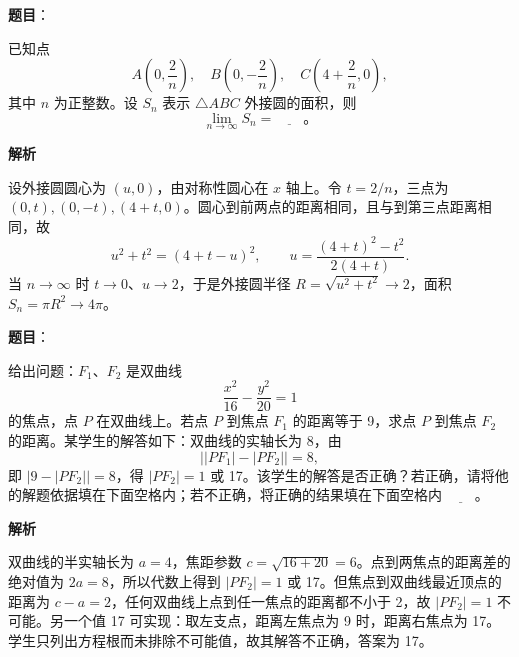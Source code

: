 \begin{answer}

\textbf{题目}：

已知点
\nopagebreak[4]
\[
    A\left(0,\frac{2}{n}\right),\quad B\left(0,-\frac{2}{n}\right),\quad C\left(4+\frac{2}{n},0\right),
\]
    其中 \(n\) 为正整数。设 \(S_n\) 表示 \(\triangle ABC\) 外接圆的面积，则
\nopagebreak[4]
\[
    \lim_{n\to\infty}S_n=\underline{\qquad}\mbox{。}
\]

\textbf{解析}

设外接圆圆心为 \((u,0)\)，由对称性圆心在 \(x\) 轴上。令 \(t=2/n\)，三点为 \((0,t),(0,-t),(4+t,0)\)。圆心到前两点的距离相同，且与到第三点距离相同，故
\nopagebreak[4]
\[
u^2+t^2=(4+t-u)^2,
\qquad u=\frac{(4+t)^2-t^2}{2(4+t)}.
\]
当 \(n\to\infty\) 时 \(t\to0\)、\(u\to2\)，于是外接圆半径 \(R=\sqrt{u^2+t^2}\to2\)，面积 \(S_n=\pi R^2\to4\pi\)。


\end{answer}
\begin{answer}

\textbf{题目}：

给出问题：\(F_1\text{、}F_2\) 是双曲线
\nopagebreak[4]
\[
    \frac{x^2}{16}-\frac{y^2}{20}=1
\]
    的焦点，点 \(P\) 在双曲线上。若点 \(P\) 到焦点 \(F_1\) 的距离等于 9，求点 \(P\) 到焦点 \(F_2\) 的距离。某学生的解答如下：双曲线的实轴长为 8，由
\nopagebreak[4]
\[
    \bigl||PF_1|-|PF_2|\bigr|=8,
\]
    即 \(|9-|PF_2||=8\)，得 \(|PF_2|=1\) 或 17。该学生的解答是否正确？若正确，请将他的解题依据填在下面空格内；若不正确，将正确的结果填在下面空格内 \(\underline{\qquad}\)。

\textbf{解析}

双曲线的半实轴长为 \(a=4\)，焦距参数 \(c=\sqrt{16+20}=6\)。点到两焦点的距离差的绝对值为 \(2a=8\)，所以代数上得到 \(|PF_2|=1\) 或 17。但焦点到双曲线最近顶点的距离为 \(c-a=2\)，任何双曲线上点到任一焦点的距离都不小于 2，故 \(|PF_2|=1\) 不可能。另一个值 17 可实现：取左支点，距离左焦点为 9 时，距离右焦点为 17。学生只列出方程根而未排除不可能值，故其解答不正确，答案为 17。


\end{answer}

